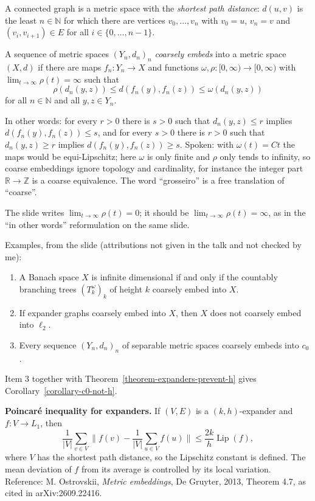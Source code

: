 A connected graph is a metric space with the
\emph{shortest path distance}: $d(u,v)$ is
the least $n \in \mathbb{N}$ for which there
are vertices $v_0, \ldots, v_n$ with
$v_0 = u$, $v_n = v$ and
$(v_i,v_{i+1}) \in E$ for all
$i \in \{0,\ldots,n-1\}$.

\begin{definition}
\label{definition-coarse-embedding-sequence}
A sequence of metric spaces $(Y_n,d_n)_n$
\emph{coarsely embeds} into a metric space
$(X,d)$ if there are maps
$f_n : Y_n \to X$ and functions
$\omega,\rho : [0,\infty) \to [0,\infty)$
with $\lim_{t\to\infty} \rho(t) = \infty$
such that
$$
\rho(d_n(y,z))
\le d(f_n(y),f_n(z))
\le \omega(d_n(y,z))
$$
for all $n \in \mathbb{N}$ and all
$y,z \in Y_n$.
\end{definition}

\noindent
In other words: for every $r > 0$ there is
$s > 0$ such that $d_n(y,z) \le r$ implies
$d(f_n(y),f_n(z)) \le s$, and for every
$s > 0$ there is $r > 0$ such that
$d_n(y,z) \ge r$ implies
$d(f_n(y),f_n(z)) \ge s$. Spoken: with
$\omega(t) = Ct$ the maps would be
equi-Lipschitz; here $\omega$ is only finite
and $\rho$ only tends to infinity, so coarse
embeddings ignore topology and cardinality,
for instance the integer part
$\mathbb{R} \to \mathbb{Z}$ is a coarse
equivalence. The word ``grosseiro'' is a free
translation of ``coarse''.

\begin{remark}
\label{remark-coarse-slide-typo}
The slide writes
$\lim_{t\to\infty} \rho(t) = 0$; it should be
$\lim_{t\to\infty} \rho(t) = \infty$, as in
the ``in other words'' reformulation on the
same slide.
\end{remark}

\noindent
Examples, from the slide (attributions not
given in the talk and not checked by me):
\begin{enumerate}
\item A Banach space $X$ is infinite
dimensional if and only if the countably
branching trees $(T_k^\omega)_k$ of height
$k$ coarsely embed into $X$.
\item If expander graphs coarsely embed into
$X$, then $X$ does not coarsely embed into
$\ell_2$.
\item Every sequence $(Y_n,d_n)_n$ of
separable metric spaces coarsely embeds into
$c_0$.
\end{enumerate}
Item 3 together with
Theorem~\ref{theorem-expanders-prevent-h}
gives Corollary~\ref{corollary-c0-not-h}.

\medskip\noindent
{\bf Poincar\'e inequality for expanders.} If
$(V,E)$ is a $(k,h)$-expander and
$f : V \to L_1$, then
$$
\frac{1}{|V|}\sum_{v \in V}
\Big\|f(v) - \frac{1}{|V|}
\sum_{u \in V} f(u)\Big\|
\le \frac{2k}{h}\operatorname{Lip}(f),
$$
where $V$ has the shortest path distance, so
the Lipschitz constant is defined. The mean
deviation of $f$ from its average is
controlled by its local variation. Reference:
M. Ostrovskii, \emph{Metric embeddings}, De
Gruyter, 2013, Theorem 4.7, as cited in
arXiv:2609.22416.

